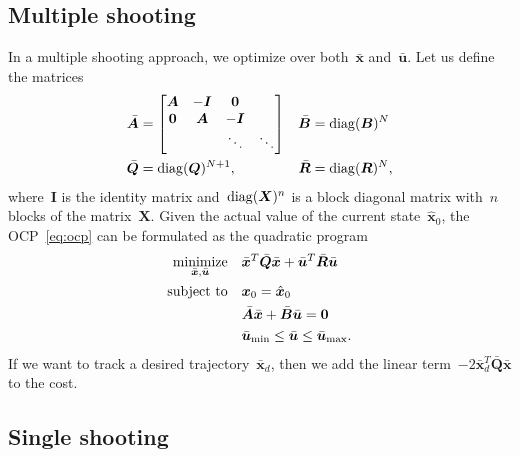 \documentclass{article}
\begin{document}
\subsection{Multiple shooting}

In a multiple shooting approach, we optimize over both~$\bar{\bm{x}}$
and~$\bar{\bm{u}}$. Let us define the matrices
\begin{align*}
  \bar{\bm{A}} &= \begin{bmatrix} \bm{A} & -\bm{I} & \bm{0} \\ \bm{0} & \bm{A} & -\bm{I} \\ & & \ddots & \ddots \end{bmatrix} &
  \bar{\bm{B}} &= \operatorname{\mathrm{diag}}(\bm{B})^{N} \\
  \bar{\bm{Q}} &= \operatorname{\mathrm{diag}}(\bm{Q})^{N+1}, & \bar{\bm{R}} &= \operatorname{\mathrm{diag}}(\bm{R})^N,
\end{align*}
where~$\bm{I}$ is the identity matrix and~$\operatorname{\mathrm{diag}}(\bm{X})^n$ is a block diagonal
matrix with~$n$ blocks of the matrix~$\bm{X}$.
Given the actual value of the current state~$\hat{\bm{x}}_0$, the
OCP~\eqref{eq:ocp} can be formulated as the quadratic program
\begin{equation}\label{eq:mpc_ms}
  \begin{aligned}
    \operatorname*{minimize}_{\bar{\bm{x}},\bar{\bm{u}}} &\quad \bar{\bm{x}}^T\bar{\bm{Q}}\bar{\bm{x}} + \bar{\bm{u}}^T\bar{\bm{R}}\bar{\bm{u}} \\
    \text{subject to} &\quad \bm{x}_0 = \hat{\bm{x}}_0 \\
                      &\quad \bar{\bm{A}}\bar{\bm{x}} + \bar{\bm{B}}\bar{\bm{u}} = \bm{0} \\
                      &\quad \bar{\bm{u}}_{\min} \leq \bar{\bm{u}} \leq \bar{\bm{u}}_{\max}.
  \end{aligned}
\end{equation}
If we want to track a desired trajectory~$\bar{\bm{x}}_d$, then we add the
linear term~$-2\bar{\bm{x}}_d^T\bar{\bm{Q}}\bar{\bm{x}}$ to the cost.

\subsection{Single shooting}
\end{document}
